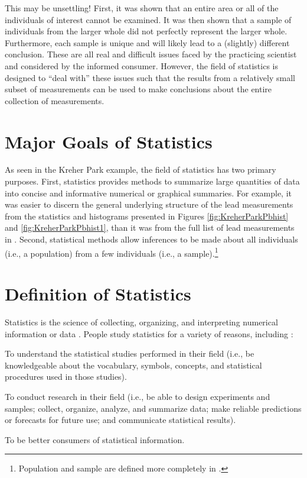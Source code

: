 \documentclass[10pt,openany]{book}\usepackage[]{graphicx}\usepackage[]{color}
\begin{document}
This may be unsettling! First, it was shown that an entire area or all of the individuals of interest cannot be examined. It was then shown that a sample of individuals from the larger whole did not perfectly represent the larger whole. Furthermore, each sample is unique and will likely lead to a (slightly) different conclusion. These are all real and difficult issues faced by the practicing scientist and considered by the informed consumer. However, the field of statistics is designed to ``deal with'' these issues such that the results from a relatively small subset of measurements can be used to make conclusions about the entire collection of measurements.



\section{Major Goals of Statistics}
As seen in the Kreher Park example, the field of statistics has two primary purposes. First, statistics provides methods to summarize large quantities of data into concise and informative numerical or graphical summaries. For example, it was easier to discern the general underlying structure of the lead measurements from the statistics and histograms presented in Figures \ref{fig:KreherParkPbhist} and \ref{fig:KreherParkPbhist1}, than it was from the full list of lead measurements in . Second, statistical methods allow inferences to be made about all individuals (i.e., a population) from a few individuals (i.e., a sample).\footnote{Population and sample are defined more completely in .}


\section{Definition of Statistics}
Statistics is the science of collecting, organizing, and interpreting numerical information or data \citep{MooreMcCabe1998}. People study statistics for a variety of reasons, including \citep{Bluman2000}:
\begin{Enumerate}
  \item To understand the statistical studies performed in their field (i.e., be knowledgeable about the vocabulary, symbols, concepts, and statistical procedures used in those studies).
  \item To conduct research in their field (i.e., be able to design experiments and samples; collect, organize, analyze, and summarize data; make reliable predictions or forecasts for future use; and communicate statistical results).
  \item To be better consumers of statistical information.
\end{Enumerate}
\end{document}
